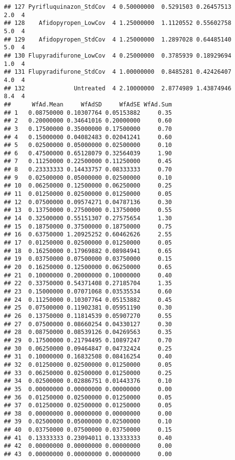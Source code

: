 \documentclass[
]{article}
\begin{document}
\begin{verbatim}
## 127 Pyrifluquinazon_StdCov  4 0.50000000  0.5291503 0.26457513      2.0  4
## 128    Afidopyropen_LowCov  4 1.25000000  1.1120552 0.55602758      5.0  4
## 129    Afidopyropen_StdCov  4 1.25000000  1.2897028 0.64485140      5.0  4
## 130 Flupyradifurone_LowCov  4 0.25000000  0.3785939 0.18929694      1.0  4
## 131 Flupyradifurone_StdCov  4 1.00000000  0.8485281 0.42426407      4.0  4
## 132              Untreated  4 2.10000000  2.8774989 1.43874946      8.4  4
##      WfAd.Mean     WfAdSD     WfAdSE WfAd.Sum
## 1   0.08750000 0.10307764 0.05153882     0.35
## 2   0.20000000 0.34641016 0.20000000     0.60
## 3   0.17500000 0.35000000 0.17500000     0.70
## 4   0.15000000 0.04082483 0.02041241     0.60
## 5   0.02500000 0.05000000 0.02500000     0.10
## 6   0.47500000 0.65128079 0.32564039     1.90
## 7   0.11250000 0.22500000 0.11250000     0.45
## 8   0.23333333 0.14433757 0.08333333     0.70
## 9   0.02500000 0.05000000 0.02500000     0.10
## 10  0.06250000 0.12500000 0.06250000     0.25
## 11  0.01250000 0.02500000 0.01250000     0.05
## 12  0.07500000 0.09574271 0.04787136     0.30
## 13  0.13750000 0.27500000 0.13750000     0.55
## 14  0.32500000 0.55151307 0.27575654     1.30
## 15  0.18750000 0.37500000 0.18750000     0.75
## 16  0.63750000 1.20925252 0.60462626     2.55
## 17  0.01250000 0.02500000 0.01250000     0.05
## 18  0.16250000 0.17969882 0.08984941     0.65
## 19  0.03750000 0.07500000 0.03750000     0.15
## 20  0.16250000 0.12500000 0.06250000     0.65
## 21  0.10000000 0.20000000 0.10000000     0.40
## 22  0.33750000 0.54371408 0.27185704     1.35
## 23  0.15000000 0.07071068 0.03535534     0.60
## 24  0.11250000 0.10307764 0.05153882     0.45
## 25  0.07500000 0.11902381 0.05951190     0.30
## 26  0.13750000 0.11814539 0.05907270     0.55
## 27  0.07500000 0.08660254 0.04330127     0.30
## 28  0.08750000 0.08539126 0.04269563     0.35
## 29  0.17500000 0.21794495 0.10897247     0.70
## 30  0.06250000 0.09464847 0.04732424     0.25
## 31  0.10000000 0.16832508 0.08416254     0.40
## 32  0.01250000 0.02500000 0.01250000     0.05
## 33  0.06250000 0.02500000 0.01250000     0.25
## 34  0.02500000 0.02886751 0.01443376     0.10
## 35  0.00000000 0.00000000 0.00000000     0.00
## 36  0.01250000 0.02500000 0.01250000     0.05
## 37  0.01250000 0.02500000 0.01250000     0.05
## 38  0.00000000 0.00000000 0.00000000     0.00
## 39  0.02500000 0.05000000 0.02500000     0.10
## 40  0.03750000 0.07500000 0.03750000     0.15
## 41  0.13333333 0.23094011 0.13333333     0.40
## 42  0.00000000 0.00000000 0.00000000     0.00
## 43  0.00000000 0.00000000 0.00000000     0.00

\end{verbatim}
\end{document}
